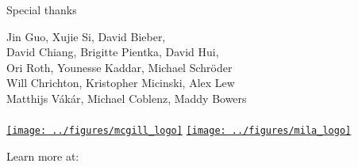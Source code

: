 \documentclass{beamer}
\begin{document}
\begin{frame}{Special thanks}
  \begin{center}
    \LARGE{
      Jin Guo, Xujie Si, David Bieber,\\
      David Chiang, Brigitte Pientka, David Hui,\\
      Ori Roth, Younesse Kaddar, Michael Schröder\\
      Will Chrichton, Kristopher Micinski, Alex Lew\\
      Matthijs Vákár, Michael Coblenz, Maddy Bowers\\
      \phantom{}\\
    }
    \href{https://cs.mcgill.ca}{\texttt{[image: ../figures/mcgill\_logo]}}
    \href{https://mila.quebec}{\texttt{[image: ../figures/mila\_logo]}}
  \end{center}
\end{frame}

\begin{frame}
  \begin{center}
    \huge{Learn more at: \\~\\
    \href{https://tidyparse.github.io}{\color{blue}{https://tidyparse.github.io}}}
  \end{center}
\end{frame}
\end{document}
